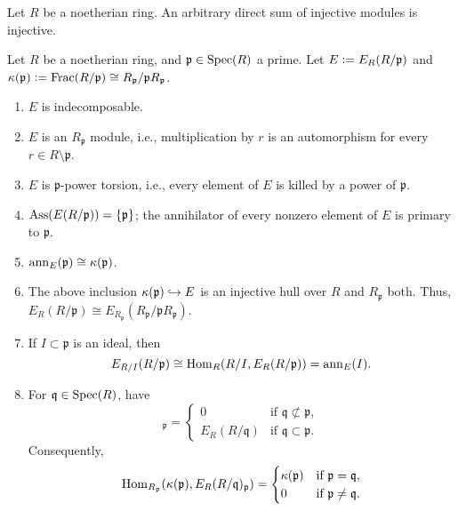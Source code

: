 \documentclass[12pt]{article}
\begin{document}
\begin{cor}
	Let $R$ be a noetherian ring. An arbitrary direct sum of injective modules is injective.
\end{cor}

\begin{thm} \label{thm:facts-about-E-R-P}
	Let $R$ be a noetherian ring, and $\mathfrak{p} \in \operatorname{Spec}(R)$ a prime. Let $E \vcentcolon= E_{R}(R/\mathfrak{p})$ and $\kappa(\mathfrak{p}) \vcentcolon= \operatorname{Frac}(R/\mathfrak{p}) \cong R_{\mathfrak{p}}/\mathfrak{p} R_{\mathfrak{p}}$.
	\begin{enumerate}[label=(\alph*)]
		\item $E$ is indecomposable.
		\item $E$ is an $R_{\mathfrak{p}}$ module, i.e., multiplication by $r$ is an automorphism for every $r \in R \setminus \mathfrak{p}$.
		\item $E$ is $\mathfrak{p}$-power torsion, i.e., every element of $E$ is killed by a power of $\mathfrak{p}$.
		\item $\operatorname{Ass}(E(R/\mathfrak{p})) = \{\mathfrak{p}\}$; the annihilator of every nonzero element of $E$ is primary to $\mathfrak{p}$.
		\item $\operatorname{ann}_{E}(\mathfrak{p}) \cong \kappa(\mathfrak{p})$. 
		\item The above inclusion $\kappa(\mathfrak{p}) \hookrightarrow E$ is an injective hull over $R$ and $R_{\mathfrak{p}}$ both. Thus, $E_{R}(R/\mathfrak{p}) \cong E_{R_{\mathfrak{p}}}(R_{\mathfrak{p}}/\mathfrak{p} R_{\mathfrak{p}})$.
		\item If $I \subset \mathfrak{p}$ is an ideal, then
		\begin{equation*} 
			E_{R/I}(R/\mathfrak{p}) \cong \operatorname{Hom}_{R}(R/I, E_{R}(R/\mathfrak{p})) = \operatorname{ann}_{E}(I). 
		\end{equation*}
		\item For $\mathfrak{q} \in \operatorname{Spec}(R)$, have
		\begin{equation*} 
			[E_{R}(R/\mathfrak{q})]_{\mathfrak{p}} = 
			\begin{cases}
				0 & \text{if } \mathfrak{q} \not\subset \mathfrak{p}, \\
				E_{R}(R/\mathfrak{q}) & \text{if } \mathfrak{q} \subset \mathfrak{p}.
			\end{cases}
		\end{equation*}
		Consequently,
		\begin{equation*} 
			\operatorname{Hom}_{R_{\mathfrak{p}}}(\kappa(\mathfrak{p}), E_{R}(R/\mathfrak{q})_{\mathfrak{p}}) = 
			\begin{cases}
				\kappa(\mathfrak{p}) & \text{if } \mathfrak{p} = \mathfrak{q}, \\
				0 & \text{if } \mathfrak{p} \neq \mathfrak{q}.
			\end{cases}
		\end{equation*}
	\end{enumerate}
\end{thm}
\end{document}
